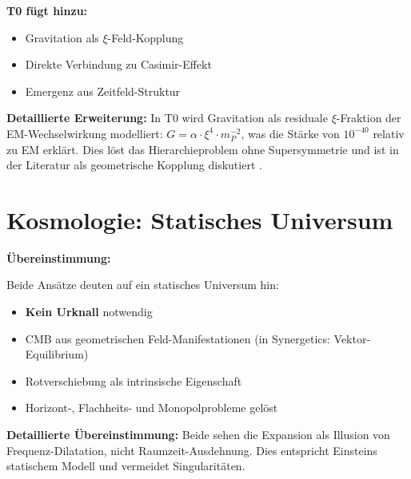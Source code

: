 \documentclass[12pt,a4paper]{article}
\newcommand{\xipar}{\xi}
\begin{document}
	\textbf{T0 fügt hinzu:}
	\begin{itemize}
		\item Gravitation als $\xi$-Feld-Kopplung
		\item Direkte Verbindung zu Casimir-Effekt
		\item Emergenz aus Zeitfeld-Struktur
	\end{itemize}
	
	\textbf{Detaillierte Erweiterung:} In T0 wird Gravitation als residuale $\xipar$-Fraktion der EM-Wechselwirkung modelliert: $G = \alpha \cdot \xipar^4 \cdot m_P^{-2}$, was die Stärke von $10^{-40}$ relativ zu EM erklärt. Dies löst das Hierarchieproblem ohne Supersymmetrie und ist in der Literatur als geometrische Kopplung diskutiert \cite{weinberg_1989}.
	
	\section{Kosmologie: Statisches Universum}
	
	\begin{gemeinsam}
		\textbf{Übereinstimmung:}
		
		Beide Ansätze deuten auf ein statisches Universum hin:
		\begin{itemize}
			\item \textbf{Kein Urknall} notwendig
			\item CMB aus geometrischen Feld-Manifestationen (in Synergetics: Vektor-Equilibrium)
			\item Rotverschiebung als intrinsische Eigenschaft
			\item Horizont-, Flachheits- und Monopolprobleme gelöst
		\end{itemize}
		
		\textbf{Detaillierte Übereinstimmung:} Beide sehen die Expansion als Illusion von Frequenz-Dilatation, nicht Raumzeit-Ausdehnung. Dies entspricht Einsteins statischem Modell \cite{einstein_1917} und vermeidet Singularitäten.
	\end{gemeinsam}
	
\end{document}
